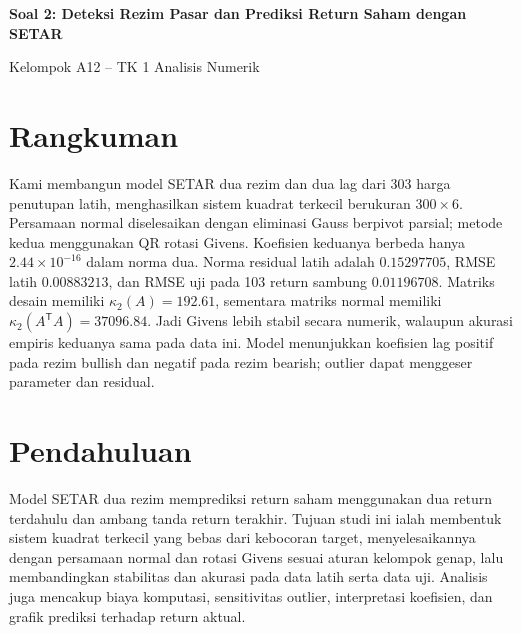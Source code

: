 \documentclass[11pt,a4paper]{article}
\numberwithin{equation}{section}
\begin{document}
\begin{center}
{\Large\bfseries Soal 2: Deteksi Rezim Pasar dan Prediksi Return Saham dengan SETAR}\par\medskip
Kelompok A12 -- TK 1 Analisis Numerik
\end{center}
\section*{Rangkuman}
Kami membangun model SETAR dua rezim dan dua lag dari 303 harga penutupan latih, menghasilkan sistem kuadrat terkecil berukuran $300\times6$. Persamaan normal diselesaikan dengan eliminasi Gauss berpivot parsial; metode kedua menggunakan QR rotasi Givens. Koefisien keduanya berbeda hanya $2.44\times10^{-16}$ dalam norma dua. Norma residual latih adalah $0.15297705$, RMSE latih $0.00883213$, dan RMSE uji pada 103 return sambung $0.01196708$. Matriks desain memiliki $\kappa_2(A)=192.61$, sementara matriks normal memiliki $\kappa_2(A^\mathsf{T}A)=37096.84$. Jadi Givens lebih stabil secara numerik, walaupun akurasi empiris keduanya sama pada data ini. Model menunjukkan koefisien lag positif pada rezim bullish dan negatif pada rezim bearish; outlier dapat menggeser parameter dan residual.
\setcounter{tocdepth}{1}
\tableofcontents
\clearpage
\section{Pendahuluan}
Model SETAR dua rezim memprediksi return saham menggunakan dua return terdahulu dan ambang tanda return terakhir. Tujuan studi ini ialah membentuk sistem kuadrat terkecil yang bebas dari kebocoran target, menyelesaikannya dengan persamaan normal dan rotasi Givens sesuai aturan kelompok genap, lalu membandingkan stabilitas dan akurasi pada data latih serta data uji. Analisis juga mencakup biaya komputasi, sensitivitas outlier, interpretasi koefisien, dan grafik prediksi terhadap return aktual.\par
\end{document}
